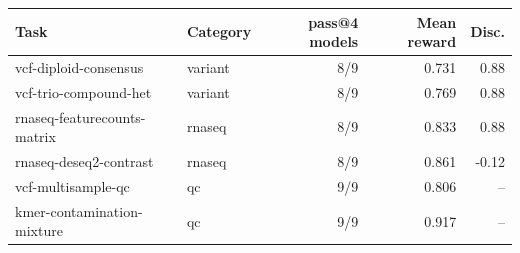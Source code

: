 \begin{tabular}{llrrr}
\toprule
Task & Category & pass@4 models & Mean reward & Disc. \\
\midrule
vcf-diploid-consensus & variant & 8/9 & 0.731 & 0.88 \\
vcf-trio-compound-het & variant & 8/9 & 0.769 & 0.88 \\
rnaseq-featurecounts-matrix & rnaseq & 8/9 & 0.833 & 0.88 \\
rnaseq-deseq2-contrast & rnaseq & 8/9 & 0.861 & -0.12 \\
vcf-multisample-qc & qc & 9/9 & 0.806 & -- \\
kmer-contamination-mixture & qc & 9/9 & 0.917 & -- \\
\bottomrule
\end{tabular}
